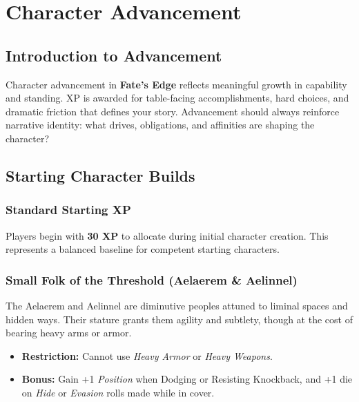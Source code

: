 \chapter{Character Advancement}
\label{chap:character-advancement}

\section{Introduction to Advancement}
\label{sec:advancement-intro}

Character advancement in \textbf{Fate's Edge} reflects meaningful growth in capability and standing. XP is awarded for table-facing accomplishments, hard choices, and dramatic friction that defines your story. Advancement should always reinforce narrative identity: what drives, obligations, and affinities are shaping the character? 

\section{Starting Character Builds}
\label{sec:starting-builds}

\subsection{Standard Starting XP}
\label{subsec:standard-starting}

Players begin with \textbf{30 XP} to allocate during initial character creation. This represents a balanced baseline for competent starting characters.

\subsection{Small Folk of the Threshold (Aelaerem \& Aelinnel)}
\label{subsec:small-folk-threshold}


The Aelaerem and Aelinnel are diminutive peoples attuned to liminal spaces and hidden ways. Their stature grants them agility and subtlety, though at the cost of bearing heavy arms or armor.

\begin{itemize}
  \item \textbf{Restriction:} Cannot use \emph{Heavy Armor} or \emph{Heavy Weapons}.
  \item \textbf{Bonus:} Gain +1 \emph{Position} when Dodging or Resisting Knockback, and +1 die on \emph{Hide} or \emph{Evasion} rolls made while in cover.
\end{itemize}

